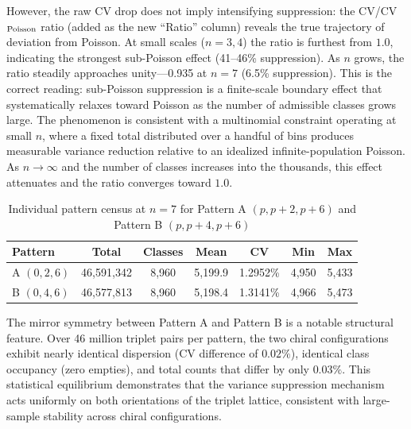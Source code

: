 \documentclass[11pt]{article}
\begin{document}
However, the raw CV drop does not imply intensifying suppression: the CV/CV$_{\rm Poisson}$ ratio (added as the new ``Ratio'' column) reveals the true trajectory of deviation from Poisson. At small scales ($n=3,4$) the ratio is furthest from $1.0$, indicating the strongest sub-Poisson effect (41--46\% suppression). As $n$ grows, the ratio steadily approaches unity---0.935 at $n=7$ (6.5\% suppression). This is the correct reading: sub-Poisson suppression is a finite-scale boundary effect that systematically relaxes toward Poisson as the number of admissible classes grows large. The phenomenon is consistent with a multinomial constraint operating at small $n$, where a fixed total distributed over a handful of bins produces measurable variance reduction relative to an idealized infinite-population Poisson. As $n \to \infty$ and the number of classes increases into the thousands, this effect attenuates and the ratio converges toward $1.0$.

\begin{table}[h]
\centering
\caption{Individual pattern census at $n=7$ for Pattern A $(p, p+2, p+6)$ and Pattern B $(p, p+4, p+6)$}
\label{tab:triplet_split}
\begin{tabular}{lcccccc}
\toprule
Pattern & Total & Classes & Mean & CV & Min & Max \\
\midrule
A $(0, 2, 6)$ & 46{,}591{,}342 & 8{,}960 & 5{,}199.9 & 1.2952\% & 4{,}950 & 5{,}433 \\
B $(0, 4, 6)$ & 46{,}577{,}813 & 8{,}960 & 5{,}198.4 & 1.3141\% & 4{,}966 & 5{,}473 \\
\bottomrule
\end{tabular}

\vspace{0.5em}
\end{table}

The mirror symmetry between Pattern A and Pattern B is a notable structural feature. Over 46 million triplet pairs per pattern, the two chiral configurations exhibit nearly identical dispersion (CV difference of $0.02\%$), identical class occupancy (zero empties), and total counts that differ by only $0.03\%$. This statistical equilibrium demonstrates that the variance suppression mechanism acts uniformly on both orientations of the triplet lattice, consistent with large-sample stability across chiral configurations.
\end{document}
